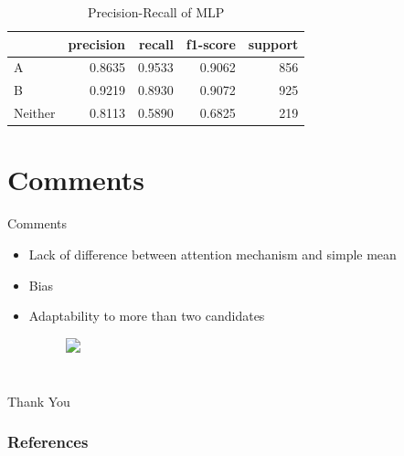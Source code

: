 \documentclass[10pt]{beamer}
\begin{document}
\begin{frame}
  \begin{table}
    \centering
    \begin{tabular}{|l|r|r|r|r|}
      \hline
      &    precision&    recall&  f1-score&    support \\
      \hline
      A&     0.8635&    0.9533&    0.9062&       856\\
      B&     0.9219&    0.8930&    0.9072&       925\\
      Neither&     0.8113&    0.5890&    0.6825&       219\\
      \hline
    \end{tabular}
    \caption{Precision-Recall of MLP}
    \label{tab:precisionrecall}
  \end{table}
\end{frame}

\section{Comments}
\begin{frame}{Comments}
  \begin{itemize}
  \item<+-> Lack of difference between attention mechanism and simple mean
  \item<+-> Bias
  \item<+-> Adaptability to more than two candidates
    \begin{figure}
      \centering
      \includegraphics<+>[width=.5\textwidth]{arch4.png}      
    \end{figure}
  \end{itemize}
\end{frame}

\section{}
\begin{frame}
  \centering
  \LARGE
  Thank You
\end{frame}
\begin{frame}
  \tiny
  \frametitle{References}
  
  
\end{frame}
\end{document}
